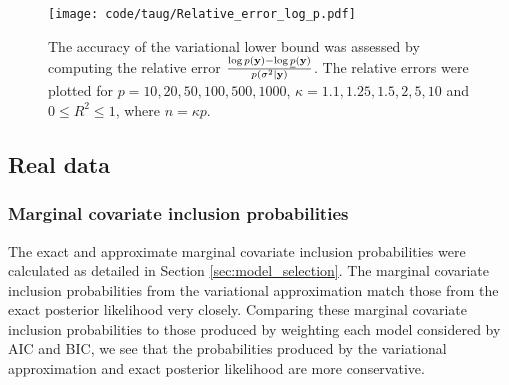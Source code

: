 \documentclass{amsart}[12pt]
\begin{document}
\begin{figure}[p]
	\texttt{[image: code/taug/Relative\_error\_log\_p.pdf]}
	\caption{The accuracy of the variational lower bound was assessed by computing the relative error
		$\frac{\log p({\bf y}) - \log \underline{p}({\bf y})}{p(\sigma^2 | {\bf y})}$. The relative errors were plotted for
		$p =10, 20, 50, 100, 500, 1000$, $\kappa = 1.1, 1.25, 1.5, 2, 5, 10$ and $0 \leq R^2 \leq 1$, where
		$n = \kappa p$.}
	\label{fig:relative_error}
\end{figure}




\subsection{Real data}
\subsubsection{Marginal covariate inclusion probabilities}

The exact and approximate marginal covariate inclusion probabilities were calculated as detailed in Section
\ref{sec:model_selection}. The marginal covariate inclusion probabilities from the variational approximation
match those from the exact posterior likelihood very closely. Comparing these marginal covariate inclusion
probabilities to those produced by weighting each model considered by AIC and BIC, we see that the
probabilities produced by the variational approximation and exact posterior likelihood are more conservative.
\end{document}
